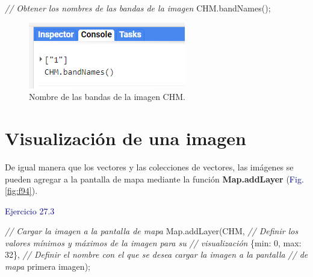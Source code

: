 \documentclass[
  12pt,
  letterpaper,
  twoside]{book}
\newenvironment{Shaded}{\begin{snugshade}}{\end{snugshade}}
\newcommand{\CommentTok}[1]{\textcolor[rgb]{0.24,0.58,0.00}{\textit{#1}}}
\newcommand{\DataTypeTok}[1]{\textcolor[rgb]{0.00,0.00,0.00}{#1}}
\newcommand{\DecValTok}[1]{\textcolor[rgb]{0.28,0.53,0.93}{#1}}
\newcommand{\FunctionTok}[1]{\textcolor[rgb]{0.48,0.12,0.64}{#1}}
\newcommand{\KeywordTok}[1]{\textcolor[rgb]{0.48,0.12,0.64}{#1}}
\newcommand{\NormalTok}[1]{#1}
\newcommand{\OperatorTok}[1]{\textcolor[rgb]{0.00,0.00,0.00}{#1}}
\newcommand{\StringTok}[1]{\textcolor[rgb]{0.87,0.29,0.22}{#1}}
\newcommand\boldpurple[1]{\textcolor{darkpurple}{\textbf{#1}}}
\begin{document}
\begin{Shaded}
\begin{Highlighting}[]
\CommentTok{// Obtener los nombres de las bandas de la imagen}
\NormalTok{CHM}\OperatorTok{.}\FunctionTok{bandNames}\NormalTok{()}\OperatorTok{;}
\end{Highlighting}
\end{Shaded}

\begin{figure}[H]

{\centering \includegraphics[width=0.8\linewidth]{Img/ej273} 

}

\caption{Nombre de las bandas de la imagen CHM.}\label{fig:f93}
\end{figure}

\hypertarget{visualizaciuxf3n-de-una-imagen}{%
\section{Visualización de una imagen}\label{visualizaciuxf3n-de-una-imagen}}

De igual manera que los vectores y las colecciones de vectores, las imágenes se pueden agregar a la pantalla de mapa mediante la función \boldpurple{Map.addLayer} (\textcolor{darkblue}{Fig.} \ref{fig:f94}).

\textcolor{darkblue}{Ejercicio 27.3}

\begin{Shaded}
\begin{Highlighting}[]
\CommentTok{// Cargar la imagen a la pantalla de mapa}
\KeywordTok{Map}\OperatorTok{.}\FunctionTok{addLayer}\NormalTok{(CHM}\OperatorTok{,} 
  \CommentTok{// Definir los valores mínimos y máximos de la imagen para su }
  \CommentTok{// visualización}
\NormalTok{  \{}\DataTypeTok{min}\OperatorTok{:} \DecValTok{0}\OperatorTok{,} \DataTypeTok{max}\OperatorTok{:} \DecValTok{32}\NormalTok{\}}\OperatorTok{,} 
  \CommentTok{// Definir el nombre con el que se desea cargar la imagen a la pantalla }
  \CommentTok{// de mapa}
  \StringTok{\textquotesingle{}primera imagen\textquotesingle{}}\NormalTok{)}\OperatorTok{;}
\end{Highlighting}
\end{Shaded}
\end{document}
